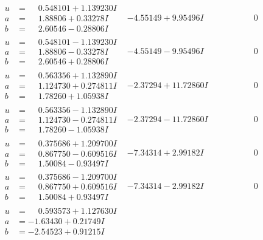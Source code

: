 \documentclass[1p]{elsarticle_modified}
\theoremstyle{definition}
\begin{document}
$$\begin{array}{c|c|c}
\begin{aligned}
u &= \phantom{-}0.548101 + 1.139230 I \\
a &= \phantom{-}1.88806 + 0.33278 I \\
b &= \phantom{-}2.60546 - 0.28806 I\end{aligned}
 & -4.55149 + 9.95496 I & \phantom{-0.000000 } 0 \\ \hline\begin{aligned}
u &= \phantom{-}0.548101 - 1.139230 I \\
a &= \phantom{-}1.88806 - 0.33278 I \\
b &= \phantom{-}2.60546 + 0.28806 I\end{aligned}
 & -4.55149 - 9.95496 I & \phantom{-0.000000 } 0 \\ \hline\begin{aligned}
u &= \phantom{-}0.563356 + 1.132890 I \\
a &= \phantom{-}1.124730 + 0.274811 I \\
b &= \phantom{-}1.78260 + 1.05938 I\end{aligned}
 & -2.37294 + 11.72860 I & \phantom{-0.000000 } 0 \\ \hline\begin{aligned}
u &= \phantom{-}0.563356 - 1.132890 I \\
a &= \phantom{-}1.124730 - 0.274811 I \\
b &= \phantom{-}1.78260 - 1.05938 I\end{aligned}
 & -2.37294 - 11.72860 I & \phantom{-0.000000 } 0 \\ \hline\begin{aligned}
u &= \phantom{-}0.375686 + 1.209700 I \\
a &= \phantom{-}0.867750 - 0.609516 I \\
b &= \phantom{-}1.50084 - 0.93497 I\end{aligned}
 & -7.34314 + 2.99182 I & \phantom{-0.000000 } 0 \\ \hline\begin{aligned}
u &= \phantom{-}0.375686 - 1.209700 I \\
a &= \phantom{-}0.867750 + 0.609516 I \\
b &= \phantom{-}1.50084 + 0.93497 I\end{aligned}
 & -7.34314 - 2.99182 I & \phantom{-0.000000 } 0 \\ \hline\begin{aligned}
u &= \phantom{-}0.593573 + 1.127630 I \\
a &= -1.63430 + 0.21749 I \\
b &= -2.54523 + 0.91215 I\end{aligned}

\end{array}$$
\end{document}
